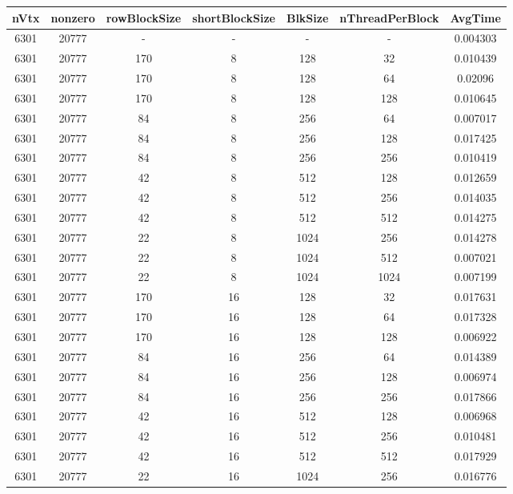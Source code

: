 \documentclass[9pt]{article}
\begin{document}
\SetBgPosition{0.25cm,-5.0cm}
\begin{tabular}{|c|c|c|c|c|c|c| }  
\hline
nVtx  & nonzero  & rowBlockSize  & shortBlockSize  & BlkSize  & nThreadPerBlock  & AvgTime \\
\hline
6301  & 20777  &  -  & -  & -  & -  &0.004303 \\
\hline
6301  & 20777  & 170  & 8  & 128  & 32  & 0.010439 \\
\hline
6301  & 20777  & 170  & 8  & 128  & 64  & 0.02096 \\
\hline
6301  & 20777  & 170  & 8  & 128  & 128  & 0.010645 \\
\hline
6301  & 20777  & 84  & 8  & 256  & 64  & 0.007017 \\
\hline
6301  & 20777  & 84  & 8  & 256  & 128  & 0.017425 \\
\hline
6301  & 20777  & 84  & 8  & 256  & 256  & 0.010419 \\
\hline
6301  & 20777  & 42  & 8  & 512  & 128  & 0.012659 \\
\hline
6301  & 20777  & 42  & 8  & 512  & 256  & 0.014035 \\
\hline
6301  & 20777  & 42  & 8  & 512  & 512  & 0.014275 \\
\hline
6301  & 20777  & 22  & 8  & 1024  & 256  & 0.014278 \\
\hline
6301  & 20777  & 22  & 8  & 1024  & 512  & 0.007021 \\
\hline
6301  & 20777  & 22  & 8  & 1024  & 1024  & 0.007199 \\
\hline
6301  & 20777  & 170  & 16  & 128  & 32  & 0.017631 \\
\hline
6301  & 20777  & 170  & 16  & 128  & 64  & 0.017328 \\
\hline
6301  & 20777  & 170  & 16  & 128  & 128  & 0.006922 \\
\hline
6301  & 20777  & 84  & 16  & 256  & 64  & 0.014389 \\
\hline
6301  & 20777  & 84  & 16  & 256  & 128  & 0.006974 \\
\hline
6301  & 20777  & 84  & 16  & 256  & 256  & 0.017866 \\
\hline
6301  & 20777  & 42  & 16  & 512  & 128  & 0.006968 \\
\hline
6301  & 20777  & 42  & 16  & 512  & 256  & 0.010481 \\
\hline
6301  & 20777  & 42  & 16  & 512  & 512  & 0.017929 \\
\hline
6301  & 20777  & 22  & 16  & 1024  & 256  & 0.016776 \\

\end{tabular}
\end{document}
